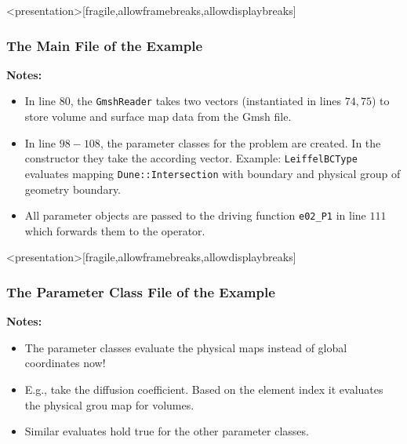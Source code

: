 \begin{frame}<presentation>[fragile,allowframebreaks,allowdisplaybreaks]
  \frametitle<presentation>{The Main File of the Example}
  
  \textbf{Notes:}
  \begin{itemize}
    \item In line $80$, the \lstinline!GmshReader! takes two vectors
      (instantiated in lines $74,75$) to store volume and surface map data from
      the Gmsh file.
    \item In line $98-108$, the parameter classes for the problem are created.
      In the constructor they take the according vector. Example:
      \lstinline!LeiffelBCType! evaluates mapping \lstinline!Dune::Intersection!
      with boundary and physical group of geometry boundary.
    \item All parameter objects are passed to the driving function
      \lstinline!e02_P1! in line $111$ which forwards them to the operator.
  \end{itemize}
\end{frame}

\begin{frame}<presentation>[fragile,allowframebreaks,allowdisplaybreaks]
  \frametitle<presentation>{The Parameter Class File of the Example}
  
  \textbf{Notes:}
  \begin{itemize}
    \item The parameter classes evaluate the physical maps instead of global
      coordinates now!
    \item E.g., take the diffusion coefficient. Based on the element index
      it evaluates the physical grou map for volumes.
    \item Similar evaluates hold true for the other parameter classes.
  \end{itemize}
\end{frame}

